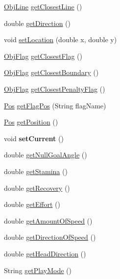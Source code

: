 \begin{DoxyCompactItemize}
\item 
\hyperlink{classObjLine}{ObjLine} \hyperlink{classMemory_a2daa67912fe6150db6242231b5c7f4a5}{getClosestLine} ()
\item 
double \hyperlink{classMemory_a51dd1c10ac4f0c6f70a40a7c302c9b10}{getDirection} ()
\item 
void \hyperlink{classMemory_a0f334995214212333a179c89662f53e1}{setLocation} (double x, double y)
\item 
\hyperlink{classObjFlag}{ObjFlag} \hyperlink{classMemory_a1813a252e55fd6d40821c8878caa25ca}{getClosestFlag} ()
\item 
\hyperlink{classObjFlag}{ObjFlag} \hyperlink{classMemory_af018362439405ab0d4aee31d8f8ca971}{getClosestBoundary} ()
\item 
\hyperlink{classObjFlag}{ObjFlag} \hyperlink{classMemory_a6a235443dd8654f5ed8e91298c4d1449}{getClosestPenaltyFlag} ()
\item 
\hyperlink{classPos}{Pos} \hyperlink{classMemory_a2248dbfdb1707931a4687ec056b12043}{getFlagPos} (String flagName)
\item 
\hyperlink{classPos}{Pos} \hyperlink{classMemory_ada2d3753c0323c6bc2a546792b8a58b2}{getPosition} ()
\item 
\hypertarget{classMemory_a007baac0372d437de2f592fc5244e4e5}{
void {\bfseries setCurrent} ()}
\label{classMemory_a007baac0372d437de2f592fc5244e4e5}

\item 
double \hyperlink{classMemory_a7a98332fa2d82e5108108c1240bf0afa}{getNullGoalAngle} ()
\item 
double \hyperlink{classMemory_a5caea216836d0a6bb068df6f99445e3c}{getStamina} ()
\item 
double \hyperlink{classMemory_a4301166648682fac690cd63db626e3c0}{getRecovery} ()
\item 
double \hyperlink{classMemory_a46b301f90943f20b72b31feddf679428}{getEffort} ()
\item 
double \hyperlink{classMemory_a6d95389ac90eb7682ddf8c9128118f48}{getAmountOfSpeed} ()
\item 
double \hyperlink{classMemory_a2ba03f42ed846e378252bb39153d415c}{getDirectionOfSpeed} ()
\item 
double \hyperlink{classMemory_a2b153c2ee50f4e2246862f359f1afdc8}{getHeadDirection} ()
\item 
String \hyperlink{classMemory_a8509d46b3402d337ebe54625fa8097aa}{getPlayMode} ()
\end{DoxyCompactItemize}
